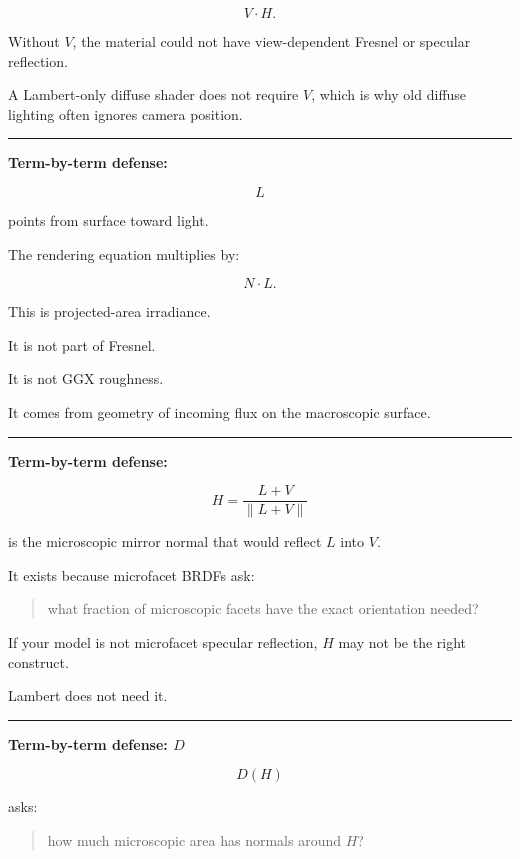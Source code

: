 \[
V\cdot H.
\]

Without \(V\), the material could not have view-dependent Fresnel or specular reflection.

A Lambert-only diffuse shader does not require \(V\), which is why old diffuse lighting often ignores camera position.

\begin{center}\rule{0.5\linewidth}{0.5pt}\end{center}

\textbf{Term-by-term defense: }

\[
L
\]

points from surface toward light.

The rendering equation multiplies by:

\[
N\cdot L.
\]

This is projected-area irradiance.

It is not part of Fresnel.

It is not GGX roughness.

It comes from geometry of incoming flux on the macroscopic surface.

\begin{center}\rule{0.5\linewidth}{0.5pt}\end{center}

\textbf{Term-by-term defense: }

\[
H=
\frac{L+V}{\|L+V\|}
\]

is the microscopic mirror normal that would reflect \(L\) into \(V\).

It exists because microfacet BRDFs ask:

\begin{quote}
what fraction of microscopic facets have the exact orientation needed?
\end{quote}

If your model is not microfacet specular reflection, \(H\) may not be the right construct.

Lambert does not need it.

\begin{center}\rule{0.5\linewidth}{0.5pt}\end{center}

\textbf{Term-by-term defense: \(D\)}

\[
D(H)
\]

asks:

\begin{quote}
how much microscopic area has normals around \(H\)?
\end{quote}

